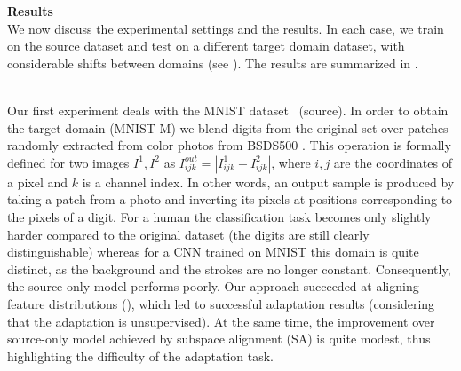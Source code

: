 \bigskip
\indent\textbf{Results}\\
\label{sect:exper_quant}
We now discuss the experimental settings and the results. In each case, we train on the source dataset and test on a different target domain dataset, with considerable shifts between domains (see ). The results are summarized in .%

\vspace{2mm}\\
Our first experiment deals with the MNIST dataset~\citep{LeCun98} (source). In order to obtain the target domain ({\sc MNIST-M}) we blend digits from the original set over patches randomly extracted from color photos from BSDS500 \citep{Arbelaez11}. This operation is formally defined for two images $ I^{1}, I^{2} $ as $ I_{ijk}^{out} = | I_{ijk}^{1} - I_{ijk}^{2} | $, where $ i, j $ are the coordinates of a pixel and $ k $ is a channel index. In other words, an output sample is produced by taking a patch from a photo and inverting its pixels at positions corresponding to the pixels of a digit. For a human the classification task becomes only slightly harder compared to the original dataset (the digits are still clearly distinguishable) whereas for a CNN trained on MNIST this domain is quite distinct, as the background and the strokes are no longer constant. Consequently, the source-only model performs poorly. Our approach succeeded at aligning feature distributions (), which led to successful adaptation results (considering that the adaptation is unsupervised). At the same time, the improvement over source-only model achieved by subspace alignment (SA) \citep{Fernando13} is quite modest, thus highlighting the difficulty of the adaptation task. 

